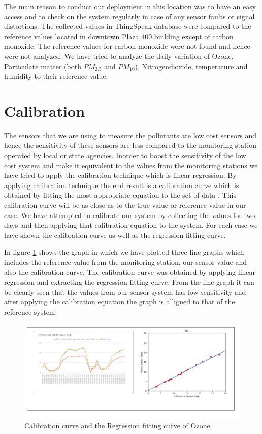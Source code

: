   The main reason to conduct our deployment in this location was to have an easy access and to check on the system regularly in case of any sensor faults or signal distortions. The collected values in ThingSpeak database were compared to the reference values located in downtown Plaza 400 building except of carbon monoxide. The reference values for carbon monoxide were not found and hence were not analyzed. We have tried to analyze the daily variation of  Ozone, Particulate matter (both $PM_{2.5}$ and $PM_{10}$), Nitrogendioxide, temperature and humidity to their reference value.
\section{Calibration}

The sensors that we are using to measure the pollutants are low cost sensors and hence the sensitivity of these sensors are less compared to the monitoring station operated by local or state agencies. Inorder to boost the sensitivity of the low cost system and make it equivalent to the values from the monitoring stations we have tried to apply the calibration technique which is linear regression. By applying calibration technique the end result is a calibration curve which is obtained by fitting the most appropriate equation to the set of data \cite{Stone2001}. This calibration curve will be as close as to the true value or reference value in our case. We have attempted to calibrate our system by collecting the values for two days and then applying that calibration equation to the system. For each case we have shown the calibration curve as well as the regression fitting curve.

In figure \ref{calozone} shows the graph in which we have plotted three line graphs which includes the reference value from the monitoring station, our sensor value and also the calibration curve. The calibration curve was obtained by applying linear regression and extracting the regression fitting curve. From the line graph it can be clearly seen that the values from our sensor system has low sensitivity and after applying the calibration equation the graph is alligned to that of the reference system.


\begin{figure}[h]
  \begin{center}
  \includegraphics[scale=0.50]{images/figure36.png}
  \end{center}
  \caption{Calibration curve and the Regression fitting curve of Ozone}
  \label{calozone}
\end{figure}

